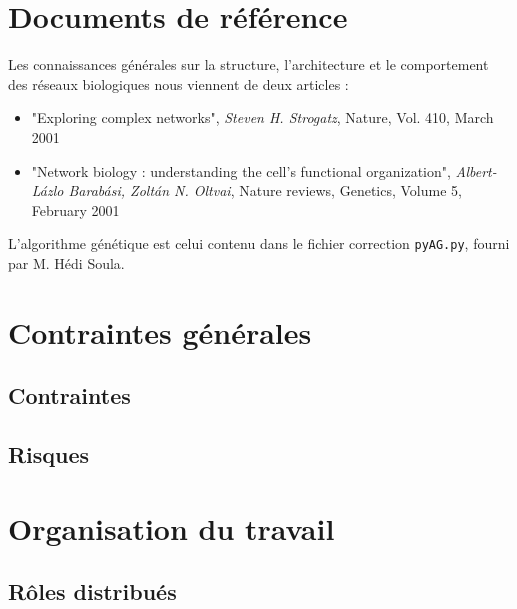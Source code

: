 \section{Documents de référence}
Les connaissances générales sur la structure, l'architecture et le comportement des réseaux biologiques nous viennent de deux articles :

\begin{itemize}
	\item "Exploring complex networks", \textit{Steven H. Strogatz}, Nature, Vol. 410, March 2001
	\item "Network biology : understanding the cell's functional organization", \textit{Albert-L\'{a}zlo Barab\'{a}si, Zolt\'{a}n N. Oltvai}, Nature reviews, Genetics, Volume 5, February 2001\medskip
\end{itemize}


L'algorithme génétique est celui contenu dans le fichier correction \texttt{pyAG.py}, fourni par M. Hédi Soula.

\section{Contraintes générales}

\subsection{Contraintes}

\subsection{Risques}

\section{Organisation du travail}
\subsection{Rôles distribués}

